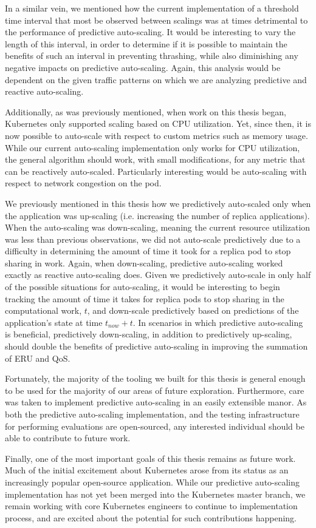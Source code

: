 In a similar vein, we mentioned how the current implementation of a threshold time
interval that most be observed between scalings was at times detrimental to
the performance of predictive auto-scaling.
It would be interesting to vary the length of this interval, in
order to determine if it is possible to maintain the benefits of such an
interval in preventing
thrashing, while also diminishing any negative impacts on predictive
auto-scaling. Again, this analysis would be dependent on the given traffic
patterns on which we are analyzing predictive and reactive auto-scaling.

Additionally, as was previously mentioned, when work on this thesis began,
Kubernetes only supported scaling based on CPU utilization. Yet, since then, it
is now possible to auto-scale with respect to custom metrics such as memory
usage. While our current auto-scaling implementation only works for CPU
utilization, the general algorithm should work, with small modifications, for
any metric that can be reactively auto-scaled. Particularly interesting would
be auto-scaling with respect to network congestion on the pod.

We previously mentioned in this thesis how we predictively auto-scaled
only when the application was up-scaling (i.e. increasing the number of replica
applications). When the auto-scaling was down-scaling, meaning the current
resource utilization was less than previous observations, we did not auto-scale
predictively due to a difficulty in determining the amount of time it took for a
replica pod to stop sharing in work. Again, when down-scaling, predictive
auto-scaling worked exactly as reactive auto-scaling does. Given we predictively
auto-scale in only half of the possible situations for auto-scaling, it would be
interesting to begin tracking the amount of time it takes for replica pods to
stop sharing in the computational work, $t$, and down-scale predictively based on
predictions of the application's state at time $t_{now} + t$. In scenarios in
which predictive auto-scaling is beneficial, predictively down-scaling, in
addition to predictively up-scaling, should double the benefits of predictive
auto-scaling in improving the summation of ERU and QoS.

Fortunately, the majority of the tooling we built for this thesis is general
enough to be used for the majority of our areas of future exploration.
Furthermore, care was taken to implement predictive auto-scaling in an easily
extensible manor. As both the predictive auto-scaling implementation, and the
testing infrastructure for performing evaluations are open-sourced, any
interested individual should be able to contribute to future work.

Finally, one of the most important goals of this thesis remains as future work.
Much of the initial excitement about Kubernetes arose from its status as an
increasingly popular open-source application. While our predictive auto-scaling
implementation has not yet been merged into the Kubernetes master branch, we
remain working with core Kubernetes engineers to continue to implementation
process, and are excited about the potential for such contributions happening.
